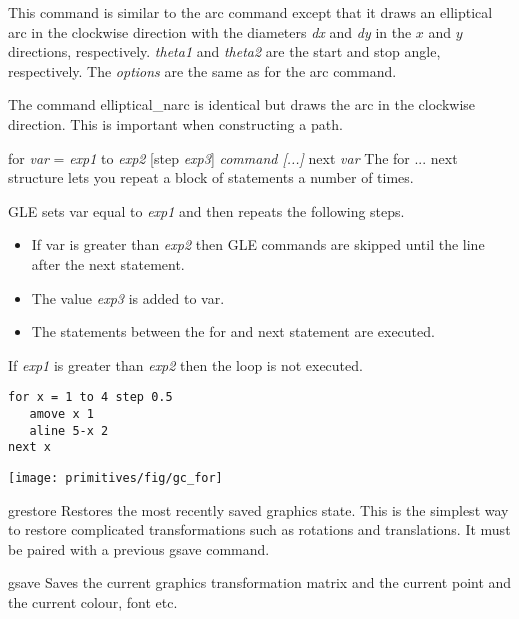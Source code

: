 \begin{commanddescription}
This command is similar to the {\sf arc} command except that it draws an elliptical arc in the clockwise direction with the diameters  {\it dx} and  {\it dy} in the $x$ and $y$ directions, respectively. {\it theta1} and {\it theta2} are the start and stop angle, respectively.  The {\it options} are the same as for the {\sf arc} command.

The command {\sf elliptical\_narc} is identical but draws the arc in the clockwise direction.  This is important when constructing a path.

\item[{\sf for {\it var} = {\it exp1} to {\it exp2} [step {\it exp3}] {\it command [...]} next {\it var}}  ]
  
The {\sf for ... next} structure lets you repeat a block of statements
a number of times.

GLE sets {\sf var} equal to {\it exp1} and then repeats the following
steps.

\begin{itemize}
\item If {\sf var} is greater than {\it exp2} then GLE commands are skipped
until the line after the {\sf next} statement.
\item The value {\it exp3} is added to {\sf var}.
\item The statements between the {\sf for} and {\sf next} statement are executed.
\end{itemize}

If {\it exp1} is greater than {\it exp2} then the loop is not executed.

\begin{minipage}[c]{8cm}
\begin{Verbatim}
for x = 1 to 4 step 0.5
   amove x 1
   aline 5-x 2
next x
\end{Verbatim}
\end{minipage}
\hfill
\begin{minipage}[c]{7cm}
\mbox{\texttt{[image: primitives/fig/gc\_for]}}
\end{minipage}

\item[{\sf grestore}]
 Restores the most recently saved graphics state.  This is the simplest way to
restore complicated transformations such as rotations and translations.  It
must be paired with a previous {\sf gsave} command.

\item[{\sf gsave}]
 Saves the current graphics transformation matrix and the current point
and the current colour, font etc.


\end{commanddescription}

